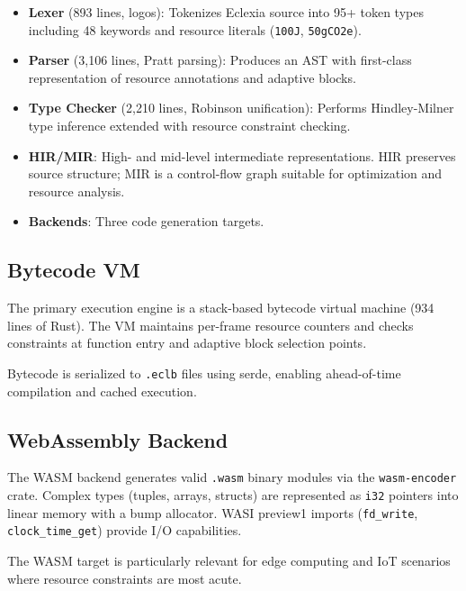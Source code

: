 \documentclass[11pt,a4paper]{article}
\begin{document}
\begin{itemize}
  \item \textbf{Lexer} (893 lines, logos): Tokenizes Eclexia source into 95+
    token types including 48 keywords and resource literals (\texttt{100J},
    \texttt{50gCO2e}).

  \item \textbf{Parser} (3,106 lines, Pratt parsing): Produces an AST with
    first-class representation of resource annotations and adaptive blocks.

  \item \textbf{Type Checker} (2,210 lines, Robinson unification): Performs
    Hindley-Milner type inference extended with resource constraint checking.

  \item \textbf{HIR/MIR}: High- and mid-level intermediate representations.
    HIR preserves source structure; MIR is a control-flow graph suitable for
    optimization and resource analysis.

  \item \textbf{Backends}: Three code generation targets.
\end{itemize}

\subsection{Bytecode VM}

The primary execution engine is a stack-based bytecode virtual machine (934
lines of Rust).  The VM maintains per-frame resource counters and checks
constraints at function entry and adaptive block selection points.

Bytecode is serialized to \texttt{.eclb} files using serde, enabling
ahead-of-time compilation and cached execution.

\subsection{WebAssembly Backend}

The WASM backend generates valid \texttt{.wasm} binary modules via the
\texttt{wasm-encoder} crate.  Complex types (tuples, arrays, structs) are
represented as \texttt{i32} pointers into linear memory with a bump allocator.
WASI preview1 imports (\texttt{fd\_write}, \texttt{clock\_time\_get}) provide
I/O capabilities.

The WASM target is particularly relevant for edge computing and IoT scenarios
where resource constraints are most acute.
\end{document}
